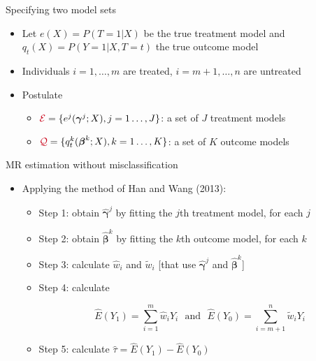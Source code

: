 \documentclass[12pt,aspectratio=169]{beamer}
\begin{document}
\begin{frame}{Specifying two model sets}
\begin{itemize}
\item Let $e(X)=P(T=1|X)$ be the true treatment  model  and  $q_t(X)=P(Y=1|X, T=t)$ the true outcome model




\item Individuals $i=1,\ldots,m$ are treated, $i=m+1,\ldots,n$ are untreated

\bigskip

\item Postulate
\begin{itemize}
\item ${\color{cred}\mathcal{E}}=\{e^j(\boldsymbol\gamma^j; X),j=1\ldots,J\}$:  a set of $J$  {\color{cred}treatment} models

\item ${\color{cred}\mathcal{Q}}=\{q_t^k(\boldsymbol\beta^k; X),k=1\ldots,K\}$: a set of $K$ {\color{cred} outcome} models

\end{itemize}




\end{itemize}
\end{frame}




\begin{frame}{MR estimation without misclassification}
\begin{itemize}


\item  Applying the method of Han and Wang (2013):

\begin{itemize}
\item 

Step 1: obtain $\hat{\boldsymbol\gamma}^j$ by fitting the $j$th treatment model, for each $j$

\item {Step 2}: obtain $\hat{\boldsymbol\beta}^k$ by fitting the $k$th {outcome} model, for each $k$

\item Step 3: calculate  $\hat w_i$  and  $\tilde w_i$ [that use $\hat{\boldsymbol\gamma}^j$ and $\hat{\boldsymbol\beta}^k$]

\item {Step 4}:  calculate


\[
\,\, \hat E(Y_1)=\sum_{i=1}^m \hat w_iY_i
\,\,\,\,
\text{and}
\,\,\,\,
\hat E(Y_0)=\sum_{i=m+1}^{n}  \tilde w_i Y_i
\]

\item Step 5:  calculate $\hat\tau=\hat E(Y_1)-\hat E(Y_0)$

\end{itemize}


\end{itemize}

\end{frame}
\end{document}
